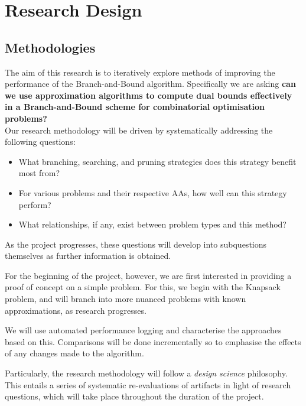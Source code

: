 \documentclass[12pt, a4paper]{article}
\begin{document}
\section{Research Design}

\subsection{Methodologies}

The aim of this research is to iteratively explore methods of improving the performance of the Branch-and-Bound algorithm. Specifically we are asking \textbf{can we use approximation algorithms to compute dual bounds effectively in a Branch-and-Bound scheme for combinatorial optimisation problems?}\\
Our research methodology will be driven by systematically addressing the following questions:

\begin{itemize}
\item What branching, searching, and pruning strategies does this strategy benefit most from?
\item For various problems and their respective AAs, how well can this strategy perform?
\item What relationships, if any, exist between problem types and this method?
\end{itemize}

As the project progresses, these questions will develop into subquestions themselves as further information is obtained.

For the beginning of the project, however, we are first interested in providing a proof of concept on a simple problem. For this, we begin with the Knapsack \cite{PisingerKP} problem, and will branch into more nuanced problems with known approximations, as research progresses.

We will use automated performance logging and characterise the approaches based on this. Comparisons will be done incrementally so to emphasise the effects of any changes made to the algorithm.

Particularly, the research methodology will follow a \textit{design science} philosophy. This entails a series of systematic re-evaluations of artifacts in light of research questions, which will take place throughout the duration of the project. 
\end{document}

